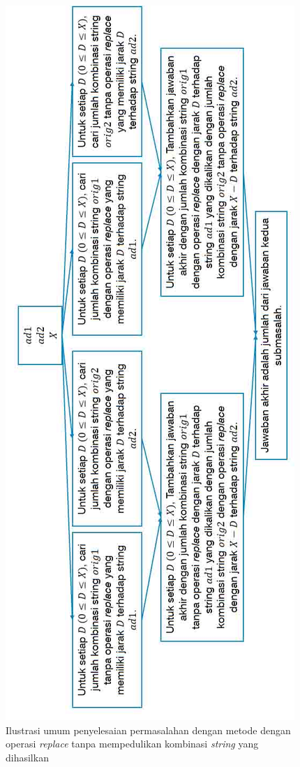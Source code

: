 \begin{figure}
	\centerline{ \includegraphics[scale=0.43]{assets/images/jpg/ilustrasi-umum-optimized-fix.jpg}}
	\caption{Ilustrasi umum penyelesaian permasalahan dengan metode \meetinthemiddle{} dengan operasi \textit{replace} tanpa mempedulikan kombinasi \textit{string} yang dihasilkan}
	\label{figure:ilustrasi_umum_penyelesaian_meet_in_the_middle_dengan_operasi_replace_tanpa_kombinasi}
\end{figure}

